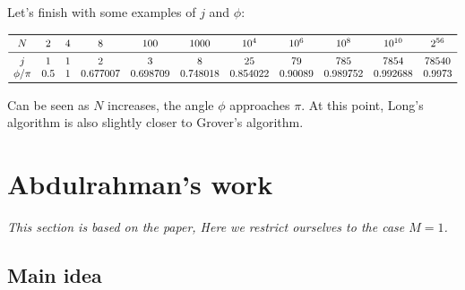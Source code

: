 \documentclass[a4paper,10pt]{book}
\numberwithin{equation}{section}
\begin{document}
Let's finish with some examples of $j$ and $\phi$:
\begin{table}[h!]
    \centering
    \begin{equation*}
        \begin{array}{ccccccccccc}
            \toprule
            N        & 2   & 4 & 8        & 100      & 1000     & 10^{4}   & 10^{6}  & 10^{8}   & 10^{10}  & 2^{56} \\
            \midrule
            j        & 1   & 1 & 2        & 3        & 8        & 25       & 79      & 785      & 7854     & 78540  \\
            \phi/\pi & 0.5 & 1 & 0.677007 & 0.698709 & 0.748018 & 0.854022 & 0.90089 & 0.989752 & 0.992688 & 0.9973 \\
            \bottomrule
        \end{array}
    \end{equation*}
    \caption{}
    \label{tab:examples}
\end{table}

Can be seen as $N$ increases, the angle $\phi$ approaches $\pi$. At this point, Long's algorithm is also slightly closer to Grover's algorithm.



\section{Abdulrahman's work}

\textit{This section is based on the paper\cite{Abdulrahman_2024}, Here we restrict ourselves to the case $M=1$.}

\subsection{Main idea}
\end{document}
